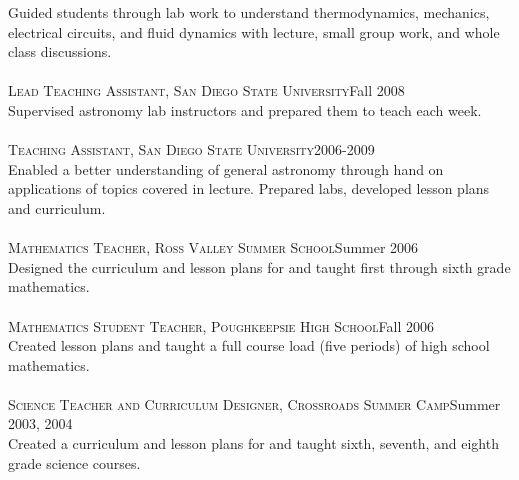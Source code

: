 \documentclass[10pt]{cv}
\begin{document}
\begin{llist}
Guided students through lab work to understand thermodynamics, mechanics, electrical circuits, and fluid dynamics with lecture, small group work, and whole class discussions.\\
\\
\textsc{Lead Teaching Assistant, San Diego State University}\hfill Fall 2008\\
Supervised astronomy lab instructors and prepared them to teach each week. \\
\\
\textsc{Teaching Assistant, San Diego State University}\hfill 2006-2009\\
Enabled a better understanding of general astronomy through hand on applications of topics covered in lecture. Prepared labs, developed lesson plans and curriculum.\\
\\
\textsc{Mathematics Teacher, Ross Valley Summer School}\hfill Summer 2006\\
Designed the curriculum and lesson plans for and taught first through sixth grade mathematics.\\
\\
\textsc{Mathematics Student Teacher, Poughkeepsie High School}\hfill Fall 2006\\
Created lesson plans and taught a full course load (five periods) of high school mathematics.\\
\\
\textsc{Science Teacher and Curriculum Designer, Crossroads Summer Camp}\hfill Summer 2003, 2004 \\
Created a curriculum and lesson plans for and taught sixth, seventh, and eighth grade science courses.
%
\end{llist}
\end{document}
